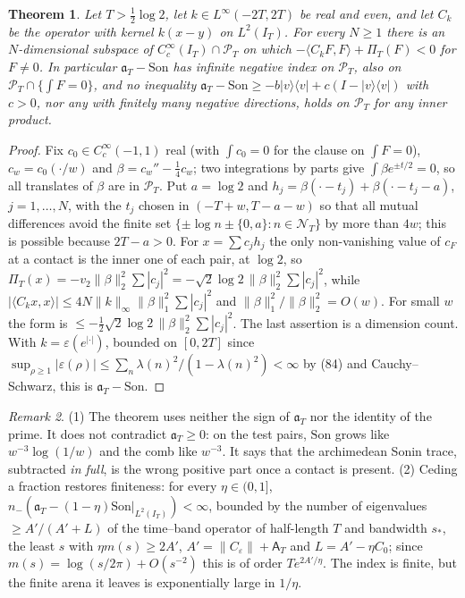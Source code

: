 \documentclass[11pt]{amsart}
\newtheorem{theorem}{Theorem}[section]
\theoremstyle{definition}
\theoremstyle{remark}
\newtheorem{remark}[theorem]{Remark}
\newcommand{\IT}{I_T}
\newcommand{\PT}{\mathcal P_T}
\newcommand{\cF}{c_F}
\newcommand{\NT}{\mathcal N_T}
\newcommand{\Aconst}{\mathsf A_T}
\newcommand{\PiT}{\Pi_T}
\newcommand{\Son}{\mathrm{Son}}
\begin{document}
\begin{theorem}\label{thm:nogo}
Let $T>\frac12\log2$, let $k\in L^\infty(-2T,2T)$ be real and even, and let $C_k$ be the operator with kernel
$k(x-y)$ on $L^2(\IT)$. For every $N\ge1$ there is an $N$-dimensional subspace of $C_c^\infty(\IT)\cap\PT$ on which
$-\langle C_kF,F\rangle+\PiT(F)<0$ for $F\neq0$. In particular $\mathfrak a_T-\Son$ has infinite negative index on
$\PT$, also on $\PT\cap\{\int F=0\}$, and no inequality
$\mathfrak a_T-\Son\ge-b|v\rangle\langle v|+c(I-|v\rangle\langle v|)$ with $c>0$, nor any with finitely many negative
directions, holds on $\PT$ for any inner product.
\end{theorem}
\begin{proof}
Fix $c_0\in C_c^\infty(-1,1)$ real (with $\int c_0=0$ for the clause on $\int F=0$), $c_w=c_0(\cdot/w)$ and $\beta=c_w''-\frac14c_w$; two integrations by parts give
$\int\beta e^{\pm t/2}=0$, so all translates of $\beta$ are in $\PT$. Put $a=\log2$ and
$h_j=\beta(\cdot-t_j)+\beta(\cdot-t_j-a)$, $j=1,\dots,N$, with the $t_j$ chosen in $(-T+w,T-a-w)$ so that all mutual
differences avoid the finite set $\{\pm\log n\pm\{0,a\}:n\in\NT\}$ by more than $4w$; this is possible because
$2T-a>0$. For $x=\sum c_jh_j$ the only non-vanishing value of $\cF$ at a contact is the inner one of each pair, at
$\log2$, so $\PiT(x)=-v_2\|\beta\|_2^2\sum|c_j|^2=-\sqrt2\log2\,\|\beta\|_2^2\sum|c_j|^2$, while
$|\langle C_kx,x\rangle|\le4N\|k\|_\infty\|\beta\|_1^2\sum|c_j|^2$ and $\|\beta\|_1^2/\|\beta\|_2^2=O(w)$. For small $w$
the form is $\le-\frac12\sqrt2\log2\,\|\beta\|_2^2\sum|c_j|^2$. The last assertion is a dimension count. With
$k=\varepsilon(e^{|\cdot|})$, bounded on $[0,2T]$ since $\sup_{\rho\ge1}|\varepsilon(\rho)|\le\sum_n\lambda(n)^2/(1-\lambda(n)^2)<\infty$ by (84) and Cauchy--Schwarz, this is $\mathfrak a_T-\Son$.
\end{proof}

\begin{remark}
(1) The theorem uses neither the sign of $\mathfrak a_T$ nor the identity of the prime. It does not contradict
$\mathfrak a_T\ge0$: on the test pairs, $\Son$ grows like $w^{-3}\log(1/w)$ and the comb like $w^{-3}$. It says that the
archimedean Sonin trace, subtracted \emph{in full}, is the wrong positive part once a contact is present. (2) Ceding a
fraction restores finiteness: for every $\eta\in(0,1]$, $n_-(\mathfrak a_T-(1-\eta)\Son|_{L^2(\IT)})<\infty$, bounded by the
number of eigenvalues $\ge A'/(A'+L)$ of the time--band operator of half-length $T$ and bandwidth $s_*$, the least $s$
with $\eta m(s)\ge2A'$, $A'=\|C_\varepsilon\|+\Aconst$ and $L=A'-\eta C_0$; since $m(s)=\log(s/2\pi)+O(s^{-2})$ this is of order
$Te^{2A'/\eta}$. The index is finite, but the finite arena it leaves is exponentially large in $1/\eta$.
\end{remark}
\end{document}
